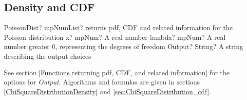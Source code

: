 \subsection{Density and CDF}

\begin{mpFunctionsExtract}
	\mpFunctionThree
	{PoissonDist? mpNumList? returns pdf, CDF and related information for the Poisson distribution}
	{x? mpNum? A real number}
	{lambda? mpNum? A real number greater 0, representing the degrees of freedom}
	{Output? String? A string describing the output choices}
\end{mpFunctionsExtract}


\vspace{0.3cm}
See section \ref{Functions returning pdf, CDF, and related information} for the options for {\itshape\sffamily Output}. Algorithms and formulas are given in sections \ref{ChiSquareDistributionDensity} and \ref{sec:ChiSquareDistribution_cdf}.



%
%



